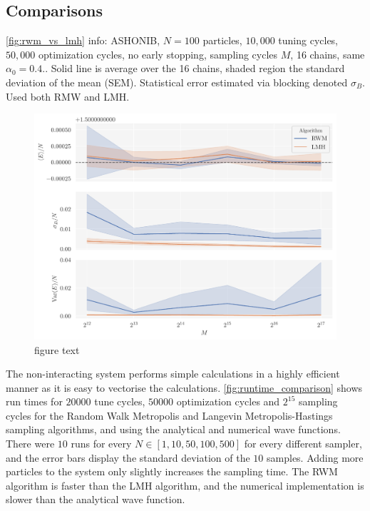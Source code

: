 \FloatBarrier

\subsection{Comparisons}

\autoref{fig:rwm_vs_lmh} info: ASHONIB, $N=100$ particles, $10,000$ tuning cycles, $50,000$ optimization cycles, no early stopping, sampling cycles $M$, 16 chains, same $\alpha_0 = 0.4.$. Solid line is average over the 16 chains, shaded region the standard deviation of the mean (SEM). Statistical error estimated via blocking denoted $\sigma_B$. Used both RMW and LMH.

\begin{figure}[!htb]
\begin{center}\includegraphics[width=\textwidth]{latex/figures/ashonib_N100_rwm_vs_lmh.pdf}
\end{center}
\caption{figure text}
\label{fig:rwm_vs_lmh}
\end{figure}



The non-interacting system performs simple calculations in a highly efficient manner as it is easy to vectorise the calculations. \autoref{fig:runtime_comparison} shows run times for $20000$ tune cycles, $50000$ optimization cycles and $2^{15}$ sampling cycles for the Random Walk Metropolis and Langevin Metropolis-Hastings sampling algorithms, and using the analytical and numerical wave functions. There were $10$ runs for every $N\in[1, 10, 50, 100, 500]$ for every different sampler, and the error bars display the standard deviation of the $10$ samples. Adding more particles to the system only slightly increases the sampling time. The RWM algorithm is faster than the LMH algorithm, and the numerical implementation is slower than the analytical wave function.  

